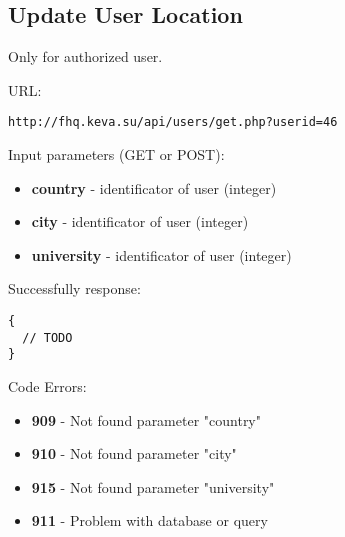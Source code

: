 \subsection{Update User Location}
\par

Only for authorized user.

URL:
\begin{Verbatim}[frame=single]
http://fhq.keva.su/api/users/get.php?userid=46
\end{Verbatim}

Input parameters (GET or POST):
\begin{itemize}
  \item \textbf{country} - identificator of user (integer)
  \item \textbf{city} - identificator of user (integer)
  \item \textbf{university} - identificator of user (integer)  
\end{itemize}

Successfully response:  \\
\begin{Verbatim}[frame=single]
{
  // TODO
}
\end{Verbatim}

Code Errors:
\begin{itemize}
  \item \textbf{909} - Not found parameter "country"
  \item \textbf{910} - Not found parameter "city"
  \item \textbf{915} - Not found parameter "university"
  \item \textbf{911} - Problem with database or query
\end{itemize}
